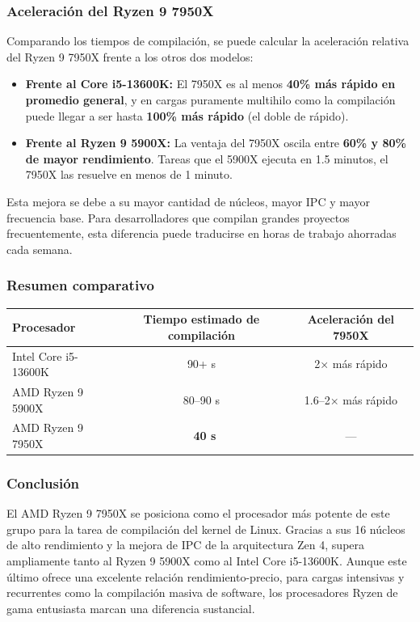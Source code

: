 \subsubsection*{Aceleración del Ryzen 9 7950X}

Comparando los tiempos de compilación, se puede calcular la aceleración relativa del Ryzen 9 7950X frente a los otros dos modelos:

\begin{itemize}
  \item \textbf{Frente al Core i5-13600K:} El 7950X es al menos \textbf{40\% más rápido en promedio general}, y en cargas puramente multihilo como la compilación puede llegar a ser hasta \textbf{100\% más rápido} (el doble de rápido).
  \item \textbf{Frente al Ryzen 9 5900X:} La ventaja del 7950X oscila entre \textbf{60\% y 80\% de mayor rendimiento}. Tareas que el 5900X ejecuta en 1.5 minutos, el 7950X las resuelve en menos de 1 minuto.
\end{itemize}

Esta mejora se debe a su mayor cantidad de núcleos, mayor IPC y mayor frecuencia base. Para desarrolladores que compilan grandes proyectos frecuentemente, esta diferencia puede traducirse en horas de trabajo ahorradas cada semana.

\subsubsection*{Resumen comparativo}

\begin{center}
\begin{tabular}{|p{4.5cm}|c|c|}
\hline
\textbf{Procesador} & \textbf{Tiempo estimado de compilación} & \textbf{Aceleración del 7950X} \\
\hline
Intel Core i5-13600K & 90+ s & 2× más rápido \\
\hline
AMD Ryzen 9 5900X & 80–90 s & 1.6–2× más rápido \\
\hline
AMD Ryzen 9 7950X & \textbf{~40 s} & --- \\
\hline
\end{tabular}
\end{center}

\subsubsection*{Conclusión}

El AMD Ryzen 9 7950X se posiciona como el procesador más potente de este grupo para la tarea de compilación del kernel de Linux. Gracias a sus 16 núcleos de alto rendimiento y la mejora de IPC de la arquitectura Zen 4, supera ampliamente tanto al Ryzen 9 5900X como al Intel Core i5-13600K. Aunque este último ofrece una excelente relación rendimiento-precio, para cargas intensivas y recurrentes como la compilación masiva de software, los procesadores Ryzen de gama entusiasta marcan una diferencia sustancial.

